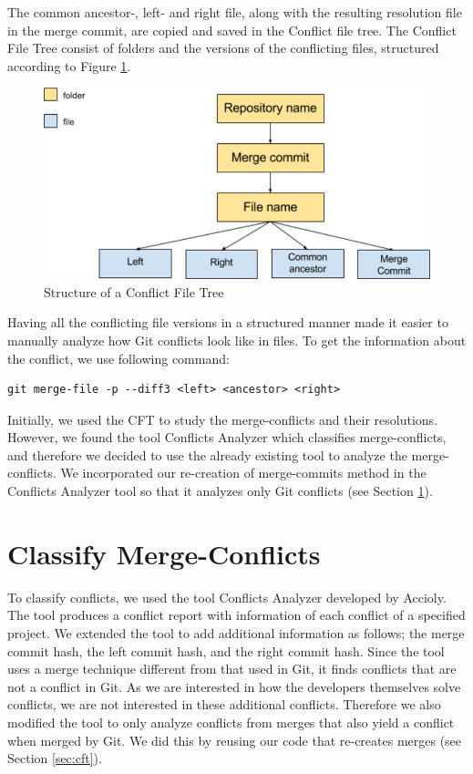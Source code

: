 The common ancestor-, left- and right file, along with the resulting resolution file in the merge commit, are copied and saved in the Conflict file tree. The Conflict File Tree consist of folders and the versions of the conflicting files, structured according to Figure \ref{fig:cft}.\\
\begin{figure}[H]
\centering
\includegraphics[width=400pt]{figure/conflicts.png}
\caption{Structure of a Conflict File Tree}\label{fig:cft}
\end{figure}

Having all the conflicting file versions in a structured manner made it easier to manually analyze how Git conflicts look like in files. To get the information about the conflict, we use following command:
\lstset{language=Bash,numbers=left,xleftmargin=2em,frame=single,framexleftmargin=1.5em}
\begin{lstlisting}[frame=single,breaklines=true,tabsize=2]
git merge-file -p --diff3 <left> <ancestor> <right>
\end{lstlisting}
Initially, we used the CFT to study the merge-conflicts and their resolutions. However, we found the tool Conflicts Analyzer which classifies merge-conflicts, and therefore we decided to use the already existing tool to analyze the merge-conflicts. We incorporated our re-creation of merge-commits method in the Conflicts Analyzer tool so that it analyzes only Git conflicts (see Section \ref{sec:cmc}).

\section{Classify Merge-Conflicts}\label{sec:cmc}
To classify conflicts, we used the tool Conflicts Analyzer developed by Accioly. The tool produces a conflict report with information of each conflict of a specified project. We extended the tool to add additional information as follows; the merge commit hash, the left commit hash, and the right commit hash. Since the tool uses a merge technique different from that used in Git, it finds conflicts that are not a conflict in Git. As we are interested in how the developers themselves solve conflicts, we are not interested in these additional conflicts. Therefore we also modified the tool to only analyze conflicts from merges that also yield a conflict when merged by Git. We did this by reusing our code that re-creates merges (see Section \ref{sec:cft}).

